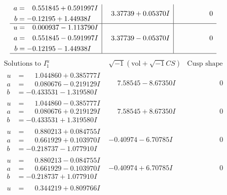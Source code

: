 \documentclass[1p]{elsarticle_modified}
\theoremstyle{definition}
\newcommand{\I}{\sqrt{-1}}
\begin{document}
$$\begin{array}{c|c|c}
\begin{aligned}
a &= \phantom{-}0.551845 + 0.591997 I \\
b &= -0.12195 + 1.44938 I\end{aligned}
 & \phantom{-}3.37739 + 0.05370 I & \phantom{-0.000000 } 0 \\ \hline\begin{aligned}
u &= \phantom{-}0.000937 - 1.113790 I \\
a &= \phantom{-}0.551845 - 0.591997 I \\
b &= -0.12195 - 1.44938 I\end{aligned}
 & \phantom{-}3.37739 - 0.05370 I & \phantom{-0.000000 } 0\\
 \hline 
 \end{array}$$\newpage$$\begin{array}{c|c|c}  
\text{Solutions to }I^u_{1}& \I (\text{vol} + \sqrt{-1}CS) & \text{Cusp shape}\\
 \hline 
\begin{aligned}
u &= \phantom{-}1.044860 + 0.385777 I \\
a &= \phantom{-}0.080676 - 0.219129 I \\
b &= -0.433531 - 1.319580 I\end{aligned}
 & \phantom{-}7.58545 - 8.67350 I & \phantom{-0.000000 } 0 \\ \hline\begin{aligned}
u &= \phantom{-}1.044860 - 0.385777 I \\
a &= \phantom{-}0.080676 + 0.219129 I \\
b &= -0.433531 + 1.319580 I\end{aligned}
 & \phantom{-}7.58545 + 8.67350 I & \phantom{-0.000000 } 0 \\ \hline\begin{aligned}
u &= \phantom{-}0.880213 + 0.084755 I \\
a &= \phantom{-}0.661929 + 0.103970 I \\
b &= -0.218737 - 1.077910 I\end{aligned}
 & -0.40974 - 6.70785 I & \phantom{-0.000000 } 0 \\ \hline\begin{aligned}
u &= \phantom{-}0.880213 - 0.084755 I \\
a &= \phantom{-}0.661929 - 0.103970 I \\
b &= -0.218737 + 1.077910 I\end{aligned}
 & -0.40974 + 6.70785 I & \phantom{-0.000000 } 0 \\ \hline\begin{aligned}
u &= \phantom{-}0.344219 + 0.809766 I \\

\end{aligned}
\end{array}$$
\end{document}
